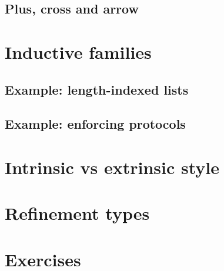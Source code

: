 \documentclass{beamer}
\begin{document}
\subsection{Plus, cross and arrow}


\section{Inductive families}

\subsection{Example: length-indexed lists}

\subsection{Example: enforcing protocols}

\section{Intrinsic vs extrinsic style}

\section{Refinement types}

\section{Exercises}
\end{document}
